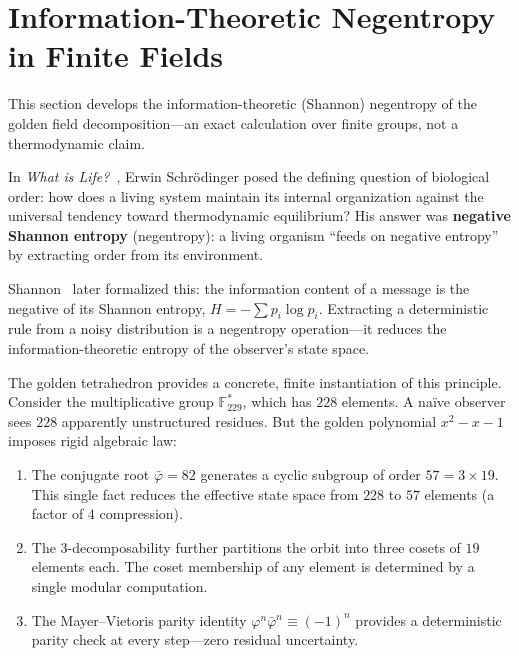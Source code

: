 \section{Information-Theoretic Negentropy in Finite Fields}
\label{sec:negentropy}

This section develops the information-theoretic (Shannon) negentropy of the golden field decomposition---an exact calculation over finite groups, not a thermodynamic claim.

In \emph{What is Life?}~\cite{schrodinger44}, Erwin Schr\"odinger posed
the defining question of biological order: how does a living system
maintain its internal organization against the universal tendency
toward thermodynamic equilibrium? His answer was \textbf{negative
Shannon entropy} (negentropy): a living organism ``feeds on negative entropy''
by extracting order from its environment.

Shannon~\cite{shannon48} later formalized this: the information content
of a message is the negative of its Shannon entropy,
$H = -\sum p_i \log p_i$. Extracting a deterministic rule from a
noisy distribution is a negentropy operation---it reduces the
information-theoretic entropy of the observer's state space.

The golden tetrahedron provides a concrete, finite instantiation
of this principle. Consider the multiplicative group
$\mathbb{F}_{229}^*$, which has $228$ elements. A na\"ive observer
sees $228$ apparently unstructured residues. But the golden
polynomial $x^2 - x - 1$ imposes rigid algebraic law:

\begin{enumerate}
  \item The conjugate root $\bar\varphi = 82$ generates a cyclic
    subgroup of order $57 = 3 \times 19$. This single fact reduces
    the effective state space from $228$ to $57$ elements (a factor
    of $4$ compression).
  \item The $3$-decomposability further partitions the orbit into
    three cosets of $19$ elements each. The coset membership of
    any element is determined by a single modular computation.
  \item The Mayer--Vietoris parity identity
    $\varphi^n \bar\varphi^n \equiv (-1)^n$ provides a deterministic
    parity check at every step---zero residual uncertainty.
\end{enumerate}

